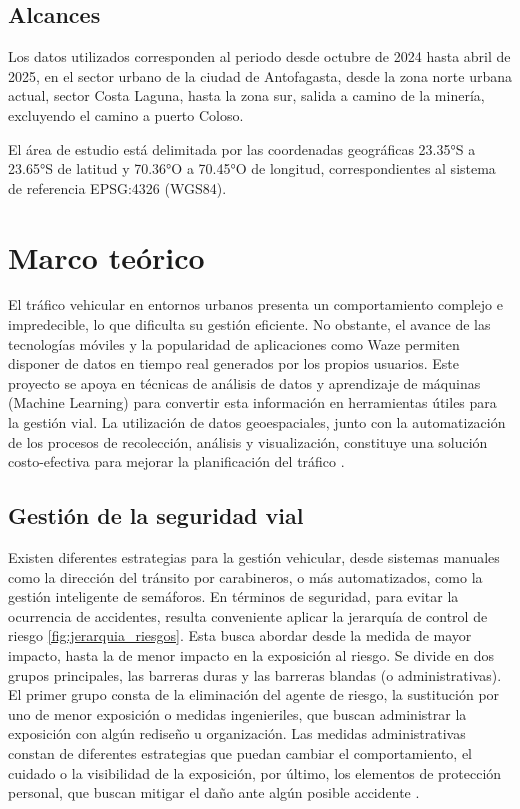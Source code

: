 \documentclass[12pt]{article}
\begin{document}
\subsection{Alcances}

Los datos utilizados corresponden al periodo desde octubre de 2024 hasta abril de 2025, en el sector urbano de la ciudad de Antofagasta, desde la zona norte urbana actual, sector Costa Laguna, hasta la zona sur, salida a camino de la minería, excluyendo el camino a puerto Coloso.

El área de estudio está delimitada por las coordenadas geográficas 23.35°S a 23.65°S de latitud y 70.36°O a 70.45°O de longitud, correspondientes al sistema de referencia EPSG:4326 (WGS84).

\section{Marco teórico}

El tráfico vehicular en entornos urbanos presenta un comportamiento complejo e impredecible, lo que dificulta su gestión eficiente. No obstante, el avance de las tecnologías móviles y la popularidad de aplicaciones como Waze permiten disponer de datos en tiempo real generados por los propios usuarios. Este proyecto se apoya en técnicas de análisis de datos y aprendizaje de máquinas (Machine Learning) para convertir esta información en herramientas útiles para la gestión vial. La utilización de datos geoespaciales, junto con la automatización de los procesos de recolección, análisis y visualización, constituye una solución costo-efectiva para mejorar la planificación del tráfico \citep{barcelo2005}.

\subsection{Gestión de la seguridad vial}

Existen diferentes estrategias para la gestión vehicular, desde sistemas manuales como la dirección del tránsito por carabineros, o más automatizados, como la gestión inteligente de semáforos. En términos de seguridad, para evitar la ocurrencia de accidentes, resulta conveniente aplicar la jerarquía de control de riesgo \cref{fig:jerarquia_riesgos}. Esta busca abordar desde la medida de mayor impacto, hasta la de menor impacto en la exposición al riesgo. Se divide en dos grupos principales, las barreras duras y las barreras blandas (o administrativas). El primer grupo consta de la eliminación del agente de riesgo, la sustitución por uno de menor exposición o medidas ingenieriles, que buscan administrar la exposición con algún rediseño u organización. Las medidas administrativas constan de diferentes estrategias que puedan cambiar el comportamiento, el cuidado o la visibilidad de la exposición, por último, los elementos de protección personal, que buscan mitigar el daño ante algún posible accidente \citep{niosh2024}.
\end{document}
